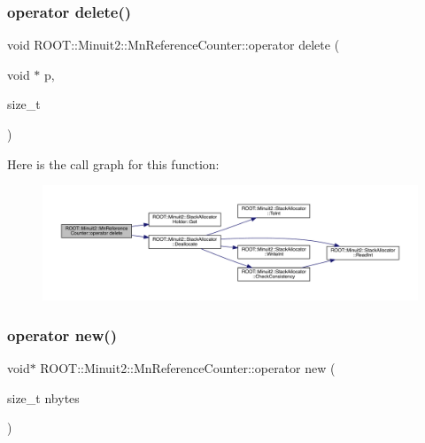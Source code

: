 \subsubsection{\texorpdfstring{operator delete()}{operator delete()}\hspace{0.1cm}{\footnotesize\ttfamily [2/2]}}
{\footnotesize\ttfamily void R\+O\+O\+T\+::\+Minuit2\+::\+Mn\+Reference\+Counter\+::operator delete (\begin{DoxyParamCaption}\item[{void $\ast$}]{p,  }\item[{size\+\_\+t}]{ }\end{DoxyParamCaption})\hspace{0.3cm}{\ttfamily [inline]}}

Here is the call graph for this function\+:
\nopagebreak
\begin{figure}[H]
\begin{center}
\leavevmode
\includegraphics[width=350pt]{dc/da2/classROOT_1_1Minuit2_1_1MnReferenceCounter_a792b5f277bb7df7c032c603eed5ae6f9_cgraph}
\end{center}
\end{figure}
\mbox{\label{classROOT_1_1Minuit2_1_1MnReferenceCounter_af7e9fdee3f67cac68328bbd05f6f2958}} 
\subsubsection{\texorpdfstring{operator new()}{operator new()}\hspace{0.1cm}{\footnotesize\ttfamily [1/2]}}
{\footnotesize\ttfamily void$\ast$ R\+O\+O\+T\+::\+Minuit2\+::\+Mn\+Reference\+Counter\+::operator new (\begin{DoxyParamCaption}\item[{size\+\_\+t}]{nbytes }\end{DoxyParamCaption})\hspace{0.3cm}{\ttfamily [inline]}}


